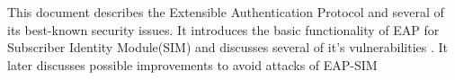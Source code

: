 This document describes the Extensible Authentication Protocol and several of its best-known security 
issues. It introduces the basic functionality of EAP for Subscriber Identity Module(SIM) and discusses several of it's vulnerabilities . It later discusses possible improvements to avoid attacks of EAP-SIM


